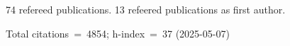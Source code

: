 74 refereed publications. 13 refeered publications as first author.

Total citations~=~4854; h-index~=~37 (2025-05-07)